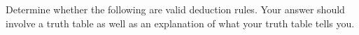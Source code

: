 \documentclass[10pt]{exam}
\begin{document}
\begin{questions}
\begin{parts}
  \end{parts}


\question[8] Determine whether the following are valid deduction rules.  Your answer should involve a truth table as well as an explanation of what your truth table tells you.
\begin{multicols}{2}
\end{multicols}

\begin{solution}
\end{solution}
\end{questions}
\end{document}
